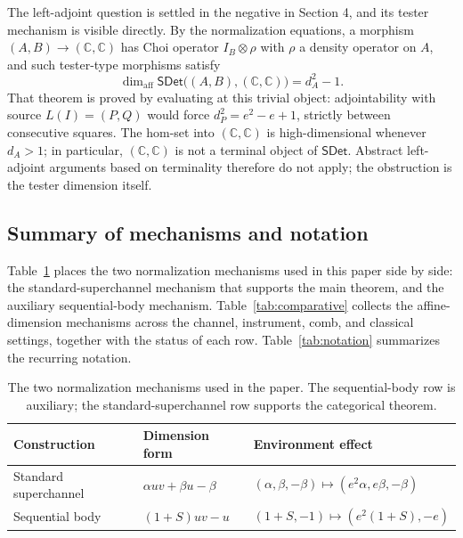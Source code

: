 \documentclass[11pt,a4paper]{article}
\theoremstyle{definition}
\theoremstyle{plain}
\theoremstyle{remark}
\newcommand{\affdim}{\dim_{\mathrm{aff}}}
\newcommand{\SDet}{\mathsf{SDet}}
\begin{document}
The left-adjoint question is settled in the negative in Section 4, and its tester mechanism is visible directly. By the normalization equations, a morphism $(A,B)\to(\mathbb C,\mathbb C)$ has Choi operator $I_B\otimes\rho$ with $\rho$ a density operator on $A$, and such tester-type morphisms satisfy
\[
\affdim\SDet\bigl((A,B),(\mathbb C,\mathbb C)\bigr)=d_A^2-1.
\]
That theorem is proved by evaluating at this trivial object: adjointability with source $L(I)=(P,Q)$ would force $d_P^2=e^2-e+1$, strictly between consecutive squares. The hom-set into $(\mathbb C,\mathbb C)$ is high-dimensional whenever $d_A>1$; in particular, $(\mathbb C,\mathbb C)$ is not a terminal object of $\SDet$. Abstract left-adjoint arguments based on terminality therefore do not apply; the obstruction is the tester dimension itself.

\subsection{Summary of mechanisms and notation}

Table~\ref{tab:mechanisms} places the two normalization mechanisms used
in this paper side by side: the standard-superchannel mechanism that
supports the main theorem, and the auxiliary sequential-body mechanism.
Table~\ref{tab:comparative} collects the affine-dimension mechanisms
across the channel, instrument, comb, and classical settings, together
with the status of each row. Table~\ref{tab:notation} summarizes the
recurring notation.

\begin{table}[ht]
\centering
\begin{tabular}{lll}
\toprule
Construction & Dimension form & Environment effect\\
\midrule
Standard superchannel & $\alpha uv+\beta u-\beta$ & $(\alpha,\beta,-\beta)\mapsto(e^2\alpha,e\beta,-\beta)$\\
Sequential body & $(1+S)uv-u$ & $(1+S,-1)\mapsto(e^2(1+S),-e)$\\
\bottomrule
\end{tabular}
\caption{The two normalization mechanisms used in the paper. The sequential-body row is auxiliary; the standard-superchannel row supports the categorical theorem.}
\label{tab:mechanisms}
\end{table}
\end{document}
